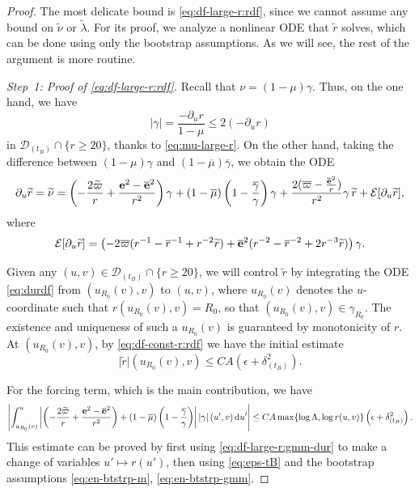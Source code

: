 \documentclass[10pt, reqno]{amsart}
\theoremstyle{definition}
\theoremstyle{remark}
\theoremstyle{conjecture}
\numberwithin{equation}{section}
\newcommand{\abs}[1]{\vert#1\vert}
\newcommand{\set}[1]{\{#1\}}
\newcommand{\ud}{\mathrm{d}}
\newcommand{\rd}{\partial}
\newcommand{\0}{\emptyset}
\newcommand{\gmm}{\gamma}
\newcommand{\dlt}{\delta}
\newcommand{\eps}{\epsilon}
\newcommand{\lmb}{\lambda}
\newcommand{\Lmb}{\Lambda}
\newcommand{\bfe}{{\bf e}}
\newcommand{\calD}{\mathcal D}
\newcommand{\calE}{\mathcal E}
\newcommand{\dur}{\nu}
\newcommand{\dvr}{\lmb}
\newcommand{\pfstep}[1]{\vspace{.5em} {\it \noindent #1.}}
\newcommand{\e}{\bfe}							%
\newcommand{\dvrbg}{\overline{\dvr}}				%
\newcommand{\durbg}{\overline{\dur}}				%
\newcommand{\rbg}{\overline{r}}					%
\newcommand{\varpibg}{\overline{\varpi}}				%
\newcommand{\mubg}{\overline{\mu}}				%
\newcommand{\gmmbg}{\overline{\gmm}}					%
\newcommand{\ebg}{\overline{\e}}					%
\newcommand{\dvrdf}{\widetilde{\dvr}}				%
\newcommand{\durdf}{\widetilde{\dur}}				%
\newcommand{\rdf}{\widetilde{r}}					%
\newcommand{\varpidf}{\widetilde{\varpi}}				%
\newcommand{\Abs}[1]{\left\vert #1 \right\vert}
\begin{document}
\begin{proof}
The most delicate bound is \eqref{eq:df-large-r:rdf}, since we cannot assume any bound on $\durdf$ or $\dvrdf$. For its proof, we analyze a nonlinear ODE that $\rdf$ solves, which can be done using only the bootstrap assumptions. As we will see, the rest of the argument is more routine.

\pfstep{Step~1: Proof of \eqref{eq:df-large-r:rdf}}
Recall that $\dur = (1-\mu) \gmm$. Thus, on the one hand, we have
\begin{equation} \label{eq:df-large-r:gmm-dur}
	\abs{\gmm} = \frac{- \rd_{u} r}{1-\mu} \leq 2 (- \rd_{u} r)
\end{equation}
in $\calD_{(t_{B})} \cap \set{r \geq 20}$, thanks to \eqref{eq:mu-large-r}. On the other hand, taking the difference between $(1-\mu) \gmm$ and $(1-\mubg) \gmmbg$, we obtain the ODE
\begin{equation} \label{eq:durdf}
	\rd_{u} \rdf = \durdf = \left( - \frac{2 \varpidf}{r} + \frac{\e^{2} - \ebg^{2}}{r^{2}} \right) \gmm + (1-\mubg) \left( 1- \frac{\gmmbg}{\gmm}\right) \gmm+ \frac{2(\varpibg - \frac{\ebg^{2}}{r})}{r^{2}} \gmm \, \rdf  + \calE[\rd_{u} \rdf],
\end{equation}
where
\begin{equation*}
	\calE[\rd_{u} \rdf] = \left( - 2 \varpibg (r^{-1} - \rbg^{-1} + r^{-2} \rdf) + \ebg^{2} (r^{-2} - \rbg^{-2} + 2 r^{-3} \rdf) \right) \gmm.
\end{equation*}

Given any $(u, v) \in \calD_{(t_{B})} \cap \set{r \geq 20}$, we will control $\rdf$ by integrating the ODE \eqref{eq:durdf} from $(u_{R_{0}}(v), v)$ to $(u, v)$, where $u_{R_{0}}(v)$ denotes the $u$-coordinate such that $r(u_{R_{0}}(v), v) = R_{0}$, so that $(u_{R_{0}}(v), v) \in \gmm_{R_{0}}$. The existence and uniqueness of such a $u_{R_{0}}(v)$ is guaranteed by monotonicity of $r$.  At $(u_{R_{0}}(v), v)$, by \eqref{eq:df-const-r:rdf} we have the initial estimate
\begin{equation*}
\abs{\rdf}(u_{R_{0}}(v), v) \leq C A\left(\eps + \dlt_{(t_{B})}^{2} \right).
\end{equation*}

For the forcing term, which is the main contribution, we have
\begin{equation*}
\Abs{\int_{u_{R_{0}}(v)}^{u} \Abs{\left( - \frac{2 \varpidf}{r} + \frac{\e^{2} - \ebg^{2}}{r^{2}} \right) + (1-\mubg) \left( 1- \frac{\gmmbg}{\gmm}\right)} \Abs{\gmm}(u', v) \, \ud u'}
\leq C A \max \set{\log \Lmb, \log r(u, v)} \left( \eps + \dlt_{(t_{B})}^{2} \right).
\end{equation*}
This estimate can be proved by first using \eqref{eq:df-large-r:gmm-dur} to make a change of variables $u' \mapsto r(u')$, then using \eqref{eq:eps-tB} and the bootstrap assumptions \eqref{eq:en-btstrp-m}, \eqref{eq:en-btstrp-gmm}. 


\end{proof}
\end{document}
